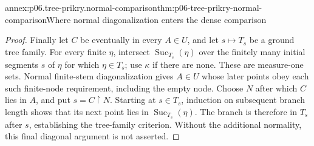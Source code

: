 \begin{annexitem}{annex:p06.tree-prikry.normal-comparison}{thm:p06-tree-prikry-normal-comparison}{Where normal diagonalization enters the dense comparison}
\begin{proof}
Finally let \(C\) be eventually in every \(A\in U\), and let
\(s\mapsto T_s\) be a ground tree family. For every finite \(\eta\),
intersect \(\operatorname{Suc}_{T_s}(\eta)\) over the finitely many
initial segments \(s\) of \(\eta\) for which \(\eta\in T_s\);
use \(\kappa\) if there are none. These are measure-one sets.
Normal finite-stem diagonalization gives \(A\in U\) whose later
points obey each such finite-node requirement, including the empty
node. Choose \(N\) after which \(C\) lies in \(A\), and put
\(s=C\mathbin{\upharpoonright}N\). Starting at \(s\in T_s\),
induction on subsequent branch length shows that its next point lies
in \(\operatorname{Suc}_{T_s}(\eta)\). The branch is therefore in
\(T_s\) after \(s\), establishing the tree-family criterion. Without
the additional normality, this final diagonal argument is not asserted.
\end{proof}
\end{annexitem}
